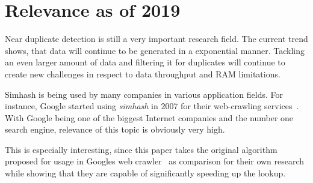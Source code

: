 \documentclass[12pt,a4paper,DIV=calc]{scrartcl}
\begin{document}
\section{Relevance as of 2019}
Near duplicate detection is still a very important research field.
The current trend shows, that data will continue to be generated in a exponential manner.
Tackling an even larger amount of data and filtering it for duplicates will continue to create new challenges in respect to data throughput and RAM limitations.

Simhash is being used by many companies in various application fields.
For instance, Google started using \emph{simhash} in 2007 for their web-crawling services~\cite{Manku:2007:DNW:1242572.1242592}.
With Google being one of the biggest Internet companies and the number one search engine, relevance of this topic is obviously very high.

This is especially interesting, since this paper takes the original algorithm proposed for usage in Googles web crawler~\cite{Manku:2007:DNW:1242572.1242592} as comparison for their own research while showing that they are capable of significantly speeding up the lookup.

\printbibliography
\end{document}
